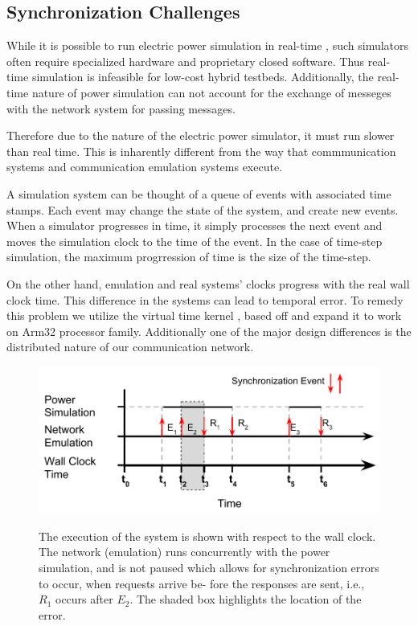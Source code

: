 \subsection{Synchronization Challenges}
While it is possible to run electric power simulation in real-time \cite{rt-sim}, such simulators often require specialized hardware and proprietary closed software. Thus real-time simulation is infeasible for low-cost hybrid testbeds. Additionally, the real-time nature of power simulation can not account for the exchange of messeges with the network system for passing messages.

Therefore due to the nature of the electric power simulator, it must run slower than real time.
This is inharently different from the way that commmunication systems and communication emulation systems execute.

A simulation system can be thought of a queue of events with associated time stamps.
Each event may change the state of the system, and create new events.
When a simulator progresses in time, it simply processes the next event and moves the simulation clock to the time of the event. In the case of time-step simulation, the maximum progrression of time is the size of the time-step.

On the other hand, emulation and real systems' clocks progress with the real wall clock time. This difference in the systems can lead to temporal error. To remedy this problem we utilize the virtual time kernel \cite{Yan:VTS:pads15},\cite{Yan:VTM:sosr15} based off \cite{Lamps:TK:pads14} and expand it to work on Arm32 processor family. Additionally one of the major design differences is the distributed nature of our communication network.



\begin{figure}
  \centering
  \includegraphics[scale=0.5]{no-pause-error.pdf}
  \label{sim-err}

  \caption{
    The execution of the system is shown with respect
    to the wall clock. The network (emulation) runs concurrently
    with the power simulation, and is not paused which allows
    for synchronization errors to occur, when requests arrive be-
    fore the responses are sent, i.e., $R_1$ occurs after $E_2$. The
  shaded box highlights the location of the error.}
\end{figure}

